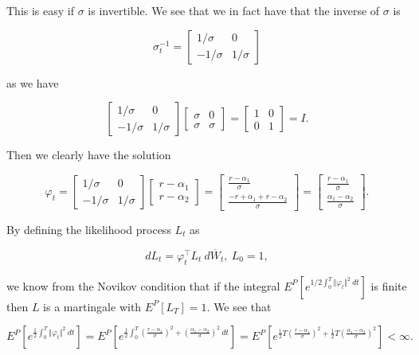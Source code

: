 \documentclass[a4paper,12pt,openany]{book}
\begin{document}
This is easy if \(\sigma\) is invertible. We see that we in fact have that the inverse of \(\sigma\) is

\[
\sigma_t^{-1}=\begin{bmatrix}
1/\sigma & 0\\
-1/\sigma & 1/\sigma
\end{bmatrix}
\]

as we have

\[
\begin{bmatrix}
1/\sigma & 0\\
-1/\sigma & 1/\sigma
\end{bmatrix}
\begin{bmatrix}
\sigma & 0\\
\sigma & \sigma
\end{bmatrix}=
\begin{bmatrix}
1 & 0\\
0 & 1
\end{bmatrix}=I.
\]

Then we clearly have the solution

\[
\varphi_t=
\begin{bmatrix}
1/\sigma & 0\\
-1/\sigma & 1/\sigma
\end{bmatrix}\begin{bmatrix}
r-\alpha_1\\
r-\alpha_2
\end{bmatrix}=
\begin{bmatrix}
\frac{r-\alpha_1}{\sigma}\\
\frac{-r+\alpha_1+r-\alpha_2}{\sigma}
\end{bmatrix}=\begin{bmatrix}
\frac{r-\alpha_1}{\sigma}\\
\frac{\alpha_1-\alpha_2}{\sigma}
\end{bmatrix}.
\]

By defining the likelihood process \(L_t\) as

\[
dL_t=\varphi_t^\top L_t\ d\overline{W}_t,\ L_0=1,
\]

we know from the Novikov condition that if the integral \(E^P[e^{1/2\int_0^T\Vert \varphi_t\Vert^2\ dt}]\) is finite then \(L\) is a martingale with \(E^P[L_T]=1\). We see that

\[
E^P\left[e^{\frac{1}{2}\int_0^T\Vert \varphi_t\Vert^2\ dt}\right]=E^P\left[e^{\frac{1}{2}\int_0^T \left(\frac{r-\alpha_1}{\sigma}\right)^2+\left(\frac{\alpha_1-\alpha_2}{\sigma}\right)^2\ dt}\right]=E^P\left[e^{\frac{1}{2}T \left(\frac{r-\alpha_1}{\sigma}\right)^2+\frac{1}{2}T\left(\frac{\alpha_1-\alpha_2}{\sigma}\right)^2}\right]<\infty.
\]
\end{document}
